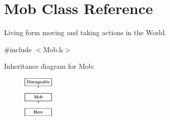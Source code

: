 \hypertarget{class_mob}{}\section{Mob Class Reference}
\label{class_mob}


Living form moving and taking actions in the World.  




{\ttfamily \#include $<$Mob.\+h$>$}

Inheritance diagram for Mob\+:\begin{figure}[H]
\begin{center}
\leavevmode
\includegraphics[height=2.000000cm]{class_mob}
\end{center}
\end{figure}
